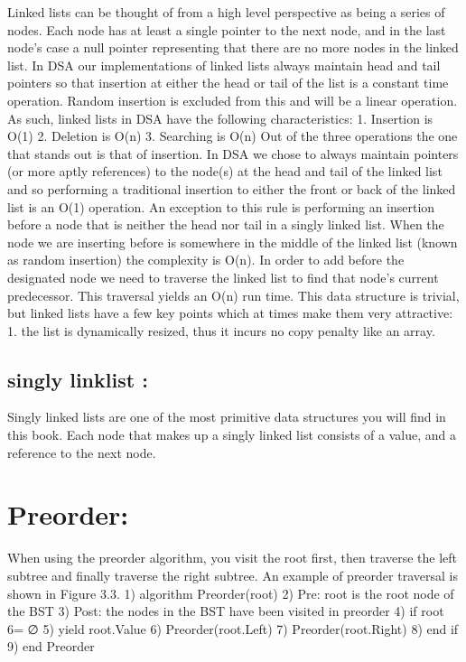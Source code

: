 \documentclass{article}
\begin{document}
  Linked lists can be thought of from a high level perspective as being a series
of nodes. Each node has at least a single pointer to the next node, and in the
last node’s case a null pointer representing that there are no more nodes in the
linked list.
In DSA our implementations of linked lists always maintain head and tail
pointers so that insertion at either the head or tail of the list is a constant
time operation. Random insertion is excluded from this and will be a linear
operation. As such, linked lists in DSA have the following characteristics:
1. Insertion is O(1)
2. Deletion is O(n)
3. Searching is O(n)
Out of the three operations the one that stands out is that of insertion. In
DSA we chose to always maintain pointers (or more aptly references) to the
node(s) at the head and tail of the linked list and so performing a traditional
insertion to either the front or back of the linked list is an O(1) operation. An
exception to this rule is performing an insertion before a node that is neither
the head nor tail in a singly linked list. When the node we are inserting before
is somewhere in the middle of the linked list (known as random insertion) the
complexity is O(n). In order to add before the designated node we need to
traverse the linked list to find that node’s current predecessor. This traversal
yields an O(n) run time.
This data structure is trivial, but linked lists have a few key points which at
times make them very attractive:
1. the list is dynamically resized, thus it incurs no copy penalty like an array.
\subsection{singly linklist :} \label{subsec:singly}

Singly linked lists are one of the most primitive data structures you will find in
this book. Each node that makes up a singly linked list consists of a value, and
a reference to the next node.

\section{Preorder:}\label{sec:pre}
When using the preorder algorithm, you visit the root first, then traverse the left
subtree and finally traverse the right subtree. An example of preorder traversal
is shown in Figure 3.3.
1) algorithm Preorder(root)
2) Pre: root is the root node of the BST
3) Post: the nodes in the BST have been visited in preorder
4) if root 6= ∅
5) yield root.Value
6) Preorder(root.Left)
7) Preorder(root.Right)
8) end if
9) end Preorder
\end{document}
